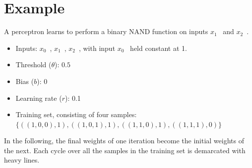 \section{Example}
A perceptron learns to perform a binary NAND function on inputs $x_1$ \, and $x_2$ \,.

\begin{itemize}
\item Inputs: $x_0$ \,, $x_1$ \,, $x_2$ \,, with input $x_0$ \, held constant at 1.
\item Threshold ($\theta$): $0.5$
\item Bias ($b$): 0
\item Learning rate ($r$): 0.1
\item Training set, consisting of four samples: $\{((1, 0, 0), 1), ((1, 0, 1), 1), ((1, 1, 0), 1), ((1, 1, 1), 0)\}$ \,
\end{itemize}


In the following, the final weights of one iteration become the initial weights of the next. Each cycle over all the samples in the training set is demarcated with heavy lines.


%
%
%
%

